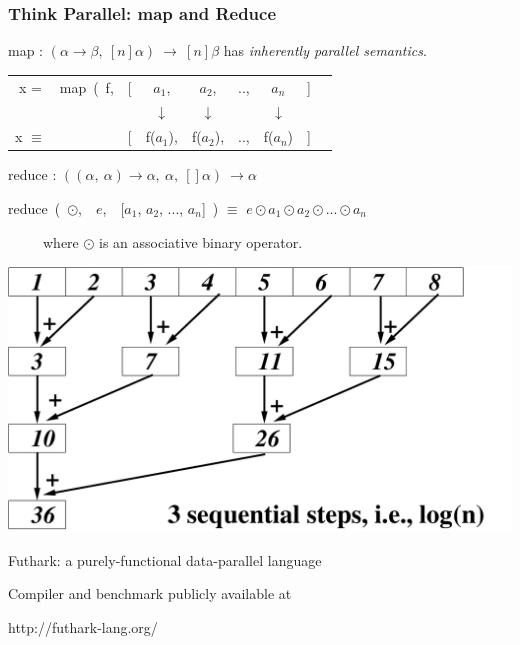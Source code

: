 \documentclass[rgb,dvipsnames]{beamer}
\renewcommand{\emph}[1]{\textcolor{structure}{#1}}
\newcommand{\emphh}[1]{\textcolor{CosGreen}{ #1}}
\begin{document}
\begin{frame}[fragile,t]
   \frametitle{Think Parallel: map and Reduce}

\emphh{map} : $(\alpha \rightarrow \beta, \ [n]\alpha) \ \rightarrow \ [n]\beta $ has \emph{\em inherently parallel semantics}.

\medskip

\begin{tabular}{crcccccl}
x = & \emphh{map}~(~f,~~[& $a_1$, & $a_2$, & .., & $a_n$ & ] & \\
    &      & $\downarrow$ & $\downarrow$ &  & $\downarrow$ & &\\
x $\equiv$ &  [  & \emphh{f($a_1$)}, & \emphh{f($a_2$)}, & .., & \emphh{f($a_n$)} & ] &
\end{tabular}


\bigskip
\bigskip

\emphh{reduce} : $((\alpha, \ \alpha) \rightarrow \alpha, \ \alpha, \ []\alpha) \ \rightarrow \alpha$

\smallskip

\emphh{reduce}~(~$\odot$,~~$e$,~~[$a_1$, $a_2$, ..., $a_n$]~) $\equiv$ \emphh{$e \odot a_1 \odot a_2 \odot ... \odot a_n$}

\smallskip

~~~~~where $\odot$ is an associative binary operator.

\bigskip

\begin{center} 
        \includegraphics[height=18ex]{Figures/ReduceEg.pdf} 
\end{center} 

\end{frame}


\begin{frame}
  \begin{center}
    \Huge
    Futhark: a purely-functional data-parallel language\\\bigskip

    Compiler and benchmark publicly available at\\\bigskip

    http://futhark-lang.org/
  \end{center}
\end{frame}
\end{document}
